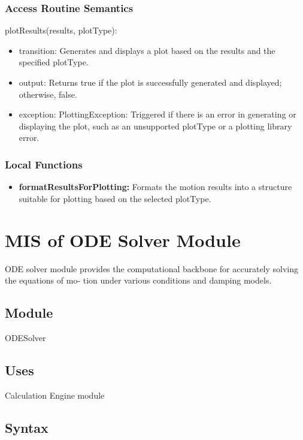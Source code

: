 \documentclass[12pt, titlepage]{article}
\begin{document}
\subsubsection{Access Routine Semantics}

\noindent plotResults(results, plotType):
\begin{itemize}
\item transition: Generates and displays a plot based on the results and the specified plotType.
\item output: Returns true if the plot is successfully generated and displayed; otherwise, false.
\item exception: PlottingException: Triggered if there is an error in generating or displaying the plot, such as an unsupported plotType or a plotting library error.
\end{itemize}

\subsubsection{Local Functions}

\begin{itemize}
  \item \textbf{formatResultsForPlotting:} Formats the motion results into a structure suitable for plotting based on the selected plotType.
\end{itemize}



\section{MIS of ODE Solver Module} \label{mPVM}

ODE solver module provides the computational backbone for accurately solving the equations of mo-
tion under various conditions and damping models.

\subsection{Module}
ODESolver

\subsection{Uses}
Calculation Engine module

\subsection{Syntax}
\end{document}
